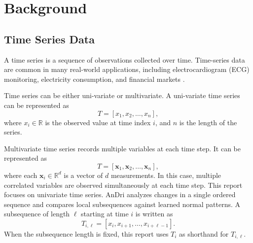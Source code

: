 \chapter{Background}







\section{Time Series Data}
A time series is a sequence of observations collected over time. Time-series data are common in many real-world applications, including electrocardiogram (ECG) monitoring, electricity consumption, and financial markets \citep{schmidl2022anomaly}.

Time series can be either uni-variate or multivariate. A uni-variate time series can be represented as
\[T = [x_1, x_2, \ldots, x_n], \]
where \(x_i \in \mathbb{R}\) is the observed value at time index \(i\), and \(n\) is the length of the series. 

Multivariate time series records multiple variables at each time step. It can be represented as
\[T = [\mathbf{x}_1, \mathbf{x}_2, \ldots, \mathbf{x}_n],\]
where each \(\mathbf{x}_i \in \mathbb{R}^d\) is a vector of \(d\) measurements. In this case, multiple correlated variables are observed simultaneously at each time step. This report focuses on univariate time series. AnDri analyzes changes in a single ordered sequence and compares local subsequences against learned normal patterns. A subsequence of length \(\ell\) starting at time \(i\) is written as
\[T_{i,\ell} = [x_i, x_{i+1}, \ldots, x_{i+\ell-1}].\]
When the subsequence length is fixed, this report uses \(T_i\) as shorthand for \(T_{i,\ell}\). 

